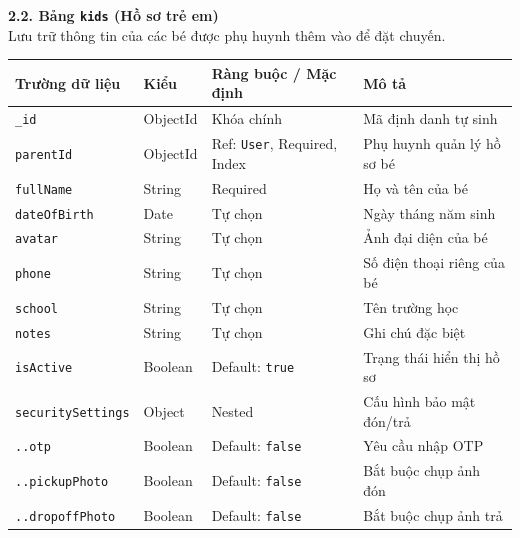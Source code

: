 \documentclass[../DoAn.tex]{subfiles}
\begin{document}
\newpage
\textbf{2.2. Bảng \texttt{kids} (Hồ sơ trẻ em)} \\
Lưu trữ thông tin của các bé được phụ huynh thêm vào để đặt chuyến.
\begin{table}[H]
    \centering
    \begin{tabular}{|l|l|p{4cm}|p{5cm}|}
        \hline
        \textbf{Trường dữ liệu}     & \textbf{Kiểu} & \textbf{Ràng buộc / Mặc định}       & \textbf{Mô tả}              \\ \hline
        \texttt{\_id}               & ObjectId      & Khóa chính                          & Mã định danh tự sinh        \\ \hline
        \texttt{parentId}           & ObjectId      & Ref: \texttt{User}, Required, Index & Phụ huynh quản lý hồ sơ bé  \\ \hline
        \texttt{fullName}           & String        & Required                            & Họ và tên của bé            \\ \hline
        \texttt{dateOfBirth}        & Date          & Tự chọn                             & Ngày tháng năm sinh         \\ \hline
        \texttt{avatar}             & String        & Tự chọn                             & Ảnh đại diện của bé         \\ \hline
        \texttt{phone}              & String        & Tự chọn                             & Số điện thoại riêng của bé  \\ \hline
        \texttt{school}             & String        & Tự chọn                             & Tên trường học              \\ \hline
        \texttt{notes}              & String        & Tự chọn                             & Ghi chú đặc biệt            \\ \hline
        \texttt{isActive}           & Boolean       & Default: \texttt{true}              & Trạng thái hiển thị hồ sơ   \\ \hline
        \texttt{securitySettings}   & Object        & Nested                              & Cấu hình bảo mật đón/trả    \\ \hline
        \texttt{..otp}              & Boolean       & Default: \texttt{false}             & Yêu cầu nhập OTP            \\ \hline
        \texttt{..pickupPhoto}      & Boolean       & Default: \texttt{false}             & Bắt buộc chụp ảnh đón       \\ \hline
        \texttt{..dropoffPhoto}     & Boolean       & Default: \texttt{false}             & Bắt buộc chụp ảnh trả       \\ \hline

\end{tabular}
\end{table}
\end{document}
